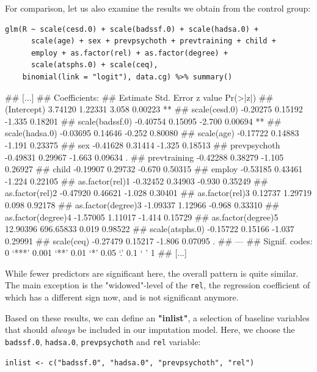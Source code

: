 For comparison, let us also examine the results we obtain from the control group:

\begin{lstlisting}
glm(R ~ scale(cesd.0) + scale(badssf.0) + scale(hadsa.0) +
      scale(age) + sex + prevpsychoth + prevtraining + child + 
      employ + as.factor(rel) + as.factor(degree) + 
      scale(atsphs.0) + scale(ceq), 
    binomial(link = "logit"), data.cg) %>% summary()
\end{lstlisting}

\begin{example}
## [...]
## Coefficients:
##                     Estimate Std. Error z value Pr(>|z|)   
## (Intercept)          3.74120    1.22331   3.058  0.00223 **
## scale(cesd.0)       -0.20275    0.15192  -1.335  0.18201   
## scale(badssf.0)     -0.40754    0.15095  -2.700  0.00694 **
## scale(hadsa.0)      -0.03695    0.14646  -0.252  0.80080   
## scale(age)          -0.17722    0.14883  -1.191  0.23375   
## sex                 -0.41628    0.31414  -1.325  0.18513   
## prevpsychoth        -0.49831    0.29967  -1.663  0.09634 . 
## prevtraining        -0.42288    0.38279  -1.105  0.26927   
## child               -0.19907    0.29732  -0.670  0.50315   
## employ              -0.53185    0.43461  -1.224  0.22105   
## as.factor(rel)1     -0.32452    0.34903  -0.930  0.35249   
## as.factor(rel)2     -0.47920    0.46621  -1.028  0.30401   
## as.factor(rel)3      0.12737    1.29719   0.098  0.92178   
## as.factor(degree)3  -1.09337    1.12966  -0.968  0.33310   
## as.factor(degree)4  -1.57005    1.11017  -1.414  0.15729   
## as.factor(degree)5  12.90396  696.65833   0.019  0.98522   
## scale(atsphs.0)     -0.15722    0.15166  -1.037  0.29991   
## scale(ceq)          -0.27479    0.15217  -1.806  0.07095 . 
## ---
## Signif. codes:  0 ‘***’ 0.001 ‘**’ 0.01 ‘*’ 0.05 ‘.’ 0.1 ‘ ’ 1
## [...]
\end{example}

While fewer predictors are significant here, the overall pattern is quite similar. The main exception is the "widowed"-level of the \texttt{rel}, the regression coefficient of which has a different sign now, and is not significant anymore. 

Based on these results, we can define an \textbf{"inlist"}, a selection of baseline variables that should \emph{always} be included in our imputation model. Here, we choose the \texttt{badssf.0}, \texttt{hadsa.0}, \texttt{prevpsychoth} and \texttt{rel} variable:

\begin{lstlisting}
inlist <- c("badssf.0", "hadsa.0", "prevpsychoth", "rel")
\end{lstlisting}

